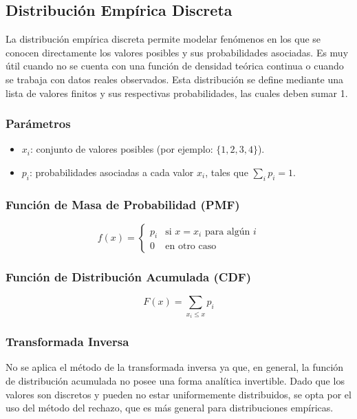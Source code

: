 \documentclass{article}
\begin{document}
\subsection{Distribución Empírica Discreta}

La distribución empírica discreta permite modelar fenómenos en los que se conocen directamente los valores posibles y sus probabilidades asociadas. Es muy útil cuando no se cuenta con una función de densidad teórica continua o cuando se trabaja con datos reales observados. Esta distribución se define mediante una lista de valores finitos y sus respectivas probabilidades, las cuales deben sumar 1.

\subsubsection*{Parámetros}
\begin{itemize}
    \item $x_i$: conjunto de valores posibles (por ejemplo: $\{1, 2, 3, 4\}$).
    \item $p_i$: probabilidades asociadas a cada valor $x_i$, tales que $\sum_i p_i = 1$.
\end{itemize}

\subsubsection*{Función de Masa de Probabilidad (PMF)}

\[
f(x) =
\begin{cases}
p_i & \text{si } x = x_i \text{ para algún } i \\
0   & \text{en otro caso}
\end{cases}
\]

\subsubsection*{Función de Distribución Acumulada (CDF)}

\[
F(x) = \sum_{x_i \leq x} p_i
\]

\subsubsection{Transformada Inversa}

No se aplica el método de la transformada inversa ya que, en general, la función de distribución acumulada no posee una forma analítica invertible. Dado que los valores son discretos y pueden no estar uniformemente distribuidos, se opta por el uso del método del rechazo, que es más general para distribuciones empíricas.
\end{document}
